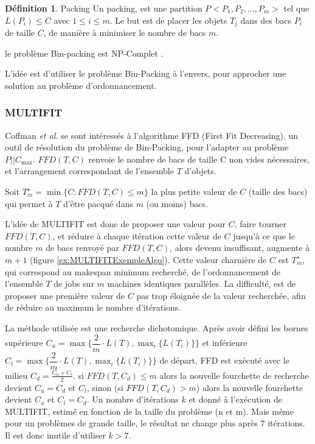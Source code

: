 \documentclass[a4paper,12pt]{report}
\theoremstyle{plain}				%
\theoremstyle{definition}				%
\newtheorem{definition}{Définition} %
\newcommand\problemGrahamP{$P||C_{\max}$\xspace}
\newcommand{\tdi}[1]{\todo[inline]{{#1}}{}}
\newcommand{\lp}[1]{\todo[author=LP,color=yellow,inline]{#1}}
\begin{document}
\begin{definition}{Packing}
  Un packing, est une partition $P<P_1, P_2, ..., P_m>$ tel que
  $L(P_i) \leq C$ avec $1 \leq i\leq m$.
  Le but est de placer les objets $T_j$ dans des bacs $P_i$ de taille
  $C$, de manière à minimiser le nombre de bacs $m$.
\end{definition}

le problème Bin-packing est NP-Complet \cite{Johnson1974WorstCasePB}.

L'idée est d'utiliser le problème Bin-Packing à l'envers, pour
approcher une solution au problème d'ordonnancement.


\subsubsection{MULTIFIT}

Coffman \emph{et al.} \cite{coffman1978application} se sont
intéressés à l'algorithme FFD (First Fit Decreasing), un outil de
résolution du problème de Bin-Packing, pour l'adapter au problème
\problemGrahamP.
$FFD(T,C)$ renvoie le nombre de bacs de taille C non vides
nécessaires, et l'arrangement correspondant de l'ensemble $T$ d'objets.

\bigskip
Soit $T_m^\star = \min\{C:FFD(T,C) \leq m\}$ la plus petite valeur de
$C$ (taille des bacs) qui permet à $T$ d'être pacqué dans $m$ (ou moins)
bacs.

\bigskip


L'idée de MULTIFIT est donc de proposer une valeur pour $C$, faire
tourner $FFD(T,C) $, et réduire à chaque itération cette valeur de $C$
jusqu'à ce que le nombre $m$ de bacs renvoyé par $FFD(T,C) $, alors
devenu insuffisant, augmente à $m+1$ (figure \ref{ex:MULTIFITExempleAlgo}).
Cette valeur charnière de $C$ est $T_m^\star$, qui correspond au
makespan minimum recherché, de l'ordonnancement de l'ensemble $T$ de
jobs sur $m$ machines identiques parallèles.
La difficulté, est de proposer une première valeur de $C$ pas trop
éloignée de la valeur recherchée, afin de réduire au maximum le nombre
d'itérations.

La méthode utilisée est une recherche dichotomique.
Après avoir défini les bornes supérieure
$C_u = \max\{\dfrac{2}{m} \cdot L(T), \max_i\{L(T_i)\} \}$ et
inférieure $C_l = \max\{\dfrac{2}{m} \cdot L(T), \max_i\{L(T_i)\} \}$
de départ, FFD est exécuté avec le milieu $C_d = \frac{C_u + C_l}{2}$.
si $FFD(T,C_d)\le m$ alors la nouvelle fourchette de recherche devient
$C_u = C_d$ et $C_l$, sinon (si $FFD(T,C_d)> m$) alors la nouvelle
fourchette devient $C_u$ et $C_l = C_d$.
Un nombre d'itérations $k$ et donné à l'exécution de MULTIFIT, estimé
en fonction de la taille du problème (n et m).
Mais même pour un problèmes de grande taille, le résultat ne change
plus après $7$ itérations.
Il est donc inutile d'utiliser $k>7$.
\end{document}

